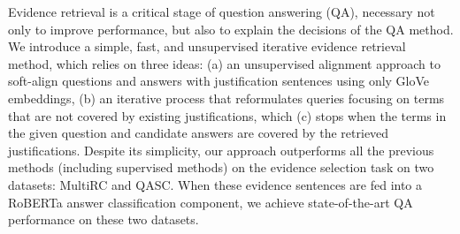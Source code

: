 Evidence retrieval is a critical stage of question answering (QA), necessary not only to improve performance, but also to explain the decisions of the QA method. We introduce a simple, fast, and unsupervised iterative evidence retrieval method, which relies on three ideas: (a) an unsupervised alignment approach to soft-align questions and answers with justification sentences using only GloVe embeddings, (b) an iterative process that reformulates queries focusing on terms that are not covered by existing justifications, which (c) stops when the terms in the given question and candidate answers are covered by the retrieved justifications. Despite its simplicity, our approach outperforms all the previous methods (including supervised methods) on the evidence selection task on two datasets: MultiRC and QASC. When these evidence sentences are fed into a RoBERTa answer classification component, we achieve state-of-the-art QA performance on these two datasets.
